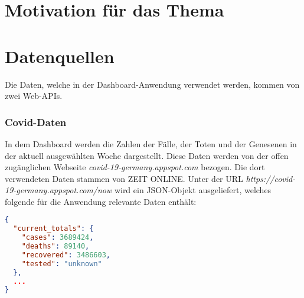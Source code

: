 \documentclass[12pt]{article}
\begin{document}
\renewcommand{\mytitle}{Dashboard zur Trend-Visualisierung\\der Medien- und Entertainment-Branche}%
\renewcommand{\myauthor}{Julia Groeniger, Vanessa Kriebel, Paul Schäfer,\\Timo Stovermann, Bastian Wynk}%
\renewcommand{\headheight}{27pt}%


\renewcommand{\plaintitle}{Inhaltsverzeichnis}%
{\def\makebox[#1][#2]#3{#3}%
	\tableofcontents
}


\clearpage
\mainmatter%

\part{Motivation für das Thema}

\part{Datenquellen}
Die Daten, welche in der Dashboard-Anwendung verwendet werden, kommen von zwei Web-APIs.
\section{Covid-Daten}
In dem Dashboard werden die Zahlen der Fälle, der Toten und der Genesenen in der aktuell ausgewählten Woche dargestellt. Diese Daten werden von der offen zugänglichen Webseite \textit{covid-19-germany.appspot.com} bezogen. Die dort verwendeten Daten stammen von ZEIT ONLINE. Unter der URL \textit{https://covid-19-germany.appspot.com/now} wird ein JSON-Objekt ausgeliefert, welches folgende für die Anwendung relevante Daten enthält:
\begin{lstlisting}[language=json,firstnumber=1]
{
  "current_totals": {
    "cases": 3689424,
    "deaths": 89140,
    "recovered": 3486603,
    "tested": "unknown"
  },
  ...
}
\end{lstlisting}
\end{document}
